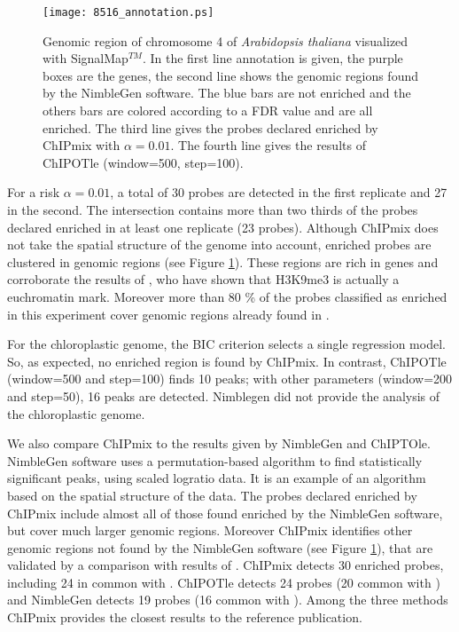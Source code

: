 \documentclass{llncs}
\begin{document}
\begin{figure}
\begin{center}
\texttt{[image: 8516\_annotation.ps]}
\end{center}
\caption{Genomic region of chromosome 4 of \textit{Arabidopsis
thaliana} visualized with SignalMap$^{TM}$. In the first line
annotation is given, the purple boxes are the genes, the second line
shows the genomic regions found by the NimbleGen software. The blue
bars are not enriched and the others bars are colored according to a
FDR value and are all enriched. The third line gives the probes
declared enriched by ChIPmix with $\alpha=0.01$. The fourth line
gives the results of ChIPOTle (window=500, step=100).
\label{Figure:SignalMAP}}
\end{figure}

For a risk $\alpha=0.01$, a total of 30 probes are detected in
the first replicate and 27 in the second. The intersection
contains more than two thirds of the probes declared enriched in at
least one replicate (23 probes). Although ChIPmix does not take
the spatial structure of the genome into account, enriched probes
are clustered in genomic regions (see Figure
\ref{Figure:SignalMAP}). These regions are rich in genes and
corroborate the results of \cite{Turck07}, who have shown that
H3K9me3 is actually a euchromatin mark. Moreover more than 80 \% of
the probes classified as enriched in this experiment cover genomic
regions already found in \cite{Turck07}.

For the chloroplastic genome, the BIC criterion selects a single
regression model. So, as expected, no enriched region is found by
ChIPmix. In contrast, ChIPOTle (window=500 and step=100) finds 10
peaks; with other parameters (window=200 and step=50), 16 peaks are
detected. Nimblegen did not provide the analysis of the
chloroplastic genome.


We also compare ChIPmix to the results given by NimbleGen and
ChIPTOle. NimbleGen software uses a permutation-based algorithm to
find statistically significant peaks, using scaled logratio data. It
is an example of an algorithm based on the spatial structure of the
data. The probes declared enriched by ChIPmix include almost all of
those found enriched by the NimbleGen software, but cover much
larger genomic regions. Moreover ChIPmix identifies other genomic
regions not found by the NimbleGen software (see Figure
\ref{Figure:SignalMAP}), that are validated by a comparison with
results of  \cite{Turck07}. ChIPmix detects 30 enriched probes,
including 24 in common with \cite{Turck07}. ChIPOTle detects
24 probes (20 common with \cite{Turck07}) and NimbleGen
detects 19 probes (16 common with \cite{Turck07}). Among
the three methods ChIPmix provides the closest results to the
reference publication.
\end{document}
